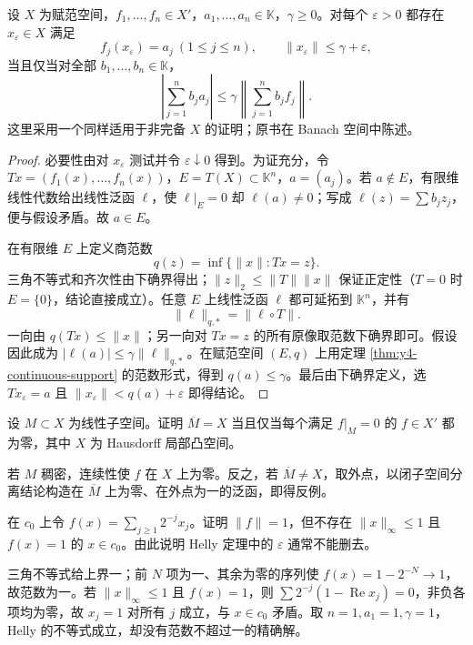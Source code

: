\begin{theorem}\label{thm:y4-helly}
设 $X$ 为赋范空间，$f_1,\ldots,f_n\in X'$，$a_1,\ldots,a_n\in\mathbb K$，$\gamma\ge0$。对每个 $\varepsilon>0$ 都存在 $x_\varepsilon\in X$ 满足
\[
 f_j(x_\varepsilon)=a_j\ (1\le j\le n),\qquad
 \|x_\varepsilon\|\le\gamma+\varepsilon,
\]
当且仅当对全部 $b_1,\ldots,b_n\in\mathbb K$，
\[
 \left|\sum_{j=1}^n b_ja_j\right|
 \le\gamma\left\|\sum_{j=1}^n b_jf_j\right\|.
\]
这里采用一个同样适用于非完备 $X$ 的证明；原书在 Banach 空间中陈述。
\end{theorem}
\begin{proof}
必要性由对 $x_\varepsilon$ 测试并令 $\varepsilon\downarrow0$ 得到。为证充分，令 $Tx=(f_1(x),\ldots,f_n(x))$，$E=T(X)\subset\mathbb K^n$，$a=(a_j)$。若 $a\notin E$，有限维线性代数给出线性泛函 $\ell$，使 $\ell|_E=0$ 却 $\ell(a)\ne0$；写成 $\ell(z)=\sum b_jz_j$，便与假设矛盾。故 $a\in E$。

在有限维 $E$ 上定义商范数
\[
 q(z)=\inf\{\|x\|:Tx=z\}.
\]
三角不等式和齐次性由下确界得出；$\|z\|_2\le\|T\|\|x\|$ 保证正定性（$T=0$ 时 $E=\{0\}$，结论直接成立）。任意 $E$ 上线性泛函 $\ell$ 都可延拓到 $\mathbb K^n$，并有
\[
 \|\ell\|_{q,*}=\|\ell\circ T\|.
\]
一向由 $q(Tx)\le\|x\|$；另一向对 $Tx=z$ 的所有原像取范数下确界即可。假设因此成为 $|\ell(a)|\le\gamma\|\ell\|_{q,*}$。在赋范空间 $(E,q)$ 上用定理 \ref{thm:y4-continuous-support} 的范数形式，得到 $q(a)\le\gamma$。最后由下确界定义，选 $Tx_\varepsilon=a$ 且 $\|x_\varepsilon\|<q(a)+\varepsilon$ 即得结论。
\end{proof}

\begin{exercise}
设 $M\subset X$ 为线性子空间。证明 $\overline M=X$ 当且仅当每个满足 $f|_M=0$ 的 $f\in X'$ 都为零，其中 $X$ 为 Hausdorff 局部凸空间。
\end{exercise}
\begin{solution}
若 $M$ 稠密，连续性使 $f$ 在 $X$ 上为零。反之，若 $\overline M\ne X$，取外点，以闭子空间分离结论构造在 $\overline M$ 上为零、在外点为一的泛函，即得反例。
\end{solution}

\begin{exercise}
在 $c_0$ 上令 $f(x)=\sum_{j\ge1}2^{-j}x_j$。证明 $\|f\|=1$，但不存在 $\|x\|_\infty\le1$ 且 $f(x)=1$ 的 $x\in c_0$。由此说明 Helly 定理中的 $\varepsilon$ 通常不能删去。
\end{exercise}
\begin{solution}
三角不等式给上界一；前 $N$ 项为一、其余为零的序列使 $f(x)=1-2^{-N}\to1$，故范数为一。若 $\|x\|_\infty\le1$ 且 $f(x)=1$，则
$\sum2^{-j}(1-\operatorname{Re}x_j)=0$，非负各项均为零，故 $x_j=1$ 对所有 $j$ 成立，与 $x\in c_0$ 矛盾。取 $n=1,a_1=1,\gamma=1$，Helly 的不等式成立，却没有范数不超过一的精确解。
\end{solution}
